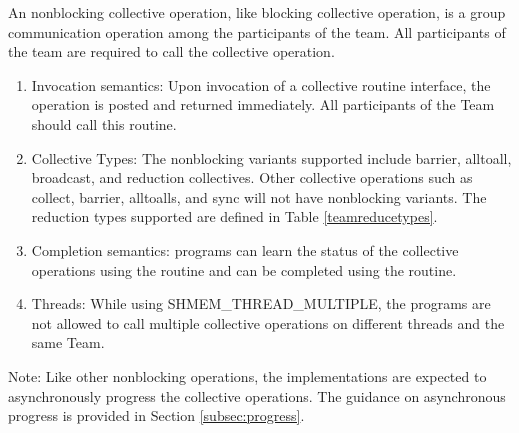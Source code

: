 An \openshmem nonblocking collective operation, like blocking collective
operation, is a group communication operation among the
participants of the team. All participants of the team are required to call the
collective operation.

\begin{enumerate}

\item Invocation semantics: Upon invocation of a collective routine interface,
the operation is posted and returned immediately. All participants of the Team
should call this routine.

\item Collective Types: The nonblocking variants supported include barrier, alltoall,
broadcast, and reduction collectives. Other collective operations such as
collect, barrier, alltoalls, and sync will not have nonblocking variants. The
reduction types supported are defined in Table \ref{teamreducetypes}.

\item Completion semantics:  \openshmem programs can learn the status of the collective operations
using the  routine and can be completed using
the  routine.

\item Threads: While using SHMEM\_THREAD\_MULTIPLE, the \openshmem
programs are not allowed to call multiple collective operations on different threads
and the same Team.

\end{enumerate}

Note: Like other nonblocking \openshmem operations, the implementations are
expected to asynchronously progress the collective operations. The guidance on
asynchronous progress is provided in Section \ref{subsec:progress}.



